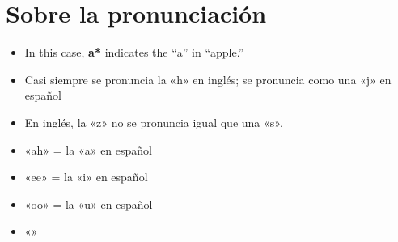 \section{Sobre la pronunciaci\'on}

\begin{itemize}
	\item In this case, \textbf{a*} indicates the ``a'' in ``apple.''
	\item Casi siempre se pronuncia la «h» en inglés;
			se pronuncia como una «j» en espa\~nol
	\item En inglés, la «z» no se pronuncia igual que una «s».
	\item «ah» = la «a» en espa\~nol
	\item «ee» = la «i» en espa\~nol
	\item «oo» = la «u» en español
	\item «»
\end{itemize}
